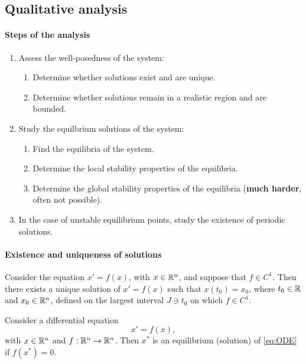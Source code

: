 \subsection{Qualitative analysis}
\paragraph{Steps of the analysis}
\begin{enumerate}
\item Assess the well-posedness of the system:
\begin{enumerate}
\item Determine whether solutions exist and are unique.
\item Determine whether solutions remain in a realistic region and are bounded.
\end{enumerate}
\item Study the equilbrium solutions of the system:
\begin{enumerate}
\item Find the equilibria of the system.
\item Determine the local stability properties of the equilibria.
\item Determine the global stability properties of the equilibria ({\bf much harder}, often not possible).
\end{enumerate}
\item In the case of unstable equilibrium points, study the existence of periodic solutions.
\end{enumerate}


\paragraph{Existence and uniqueness of solutions}
\begin{theorem}
Consider the equation $x'=f(x)$, with $x\in\mathbb{R}^n$, and suppose that $f\in C^1$. Then there exists a unique solution of $x'=f(x)$ such that $x(t_0)=x_0$, where $t_0\in\mathbb{R}$ and $x_0\in\mathbb{R}^n$, defined on the largest interval $J\ni t_0$ on which $f\in C^1$.
\end{theorem}



\begin{definition}
Consider a differential equation
\begin{equation}\label{eq:ODE}
x'=f(x),
\end{equation}
with $x\in\mathbb{R}^n$ and $f:\mathbb{R}^n\to\mathbb{R}^n$.
Then $x^*$ is an equilibrium (solution) of \eqref{eq:ODE} if $f(x^*)=0$.
\end{definition}

